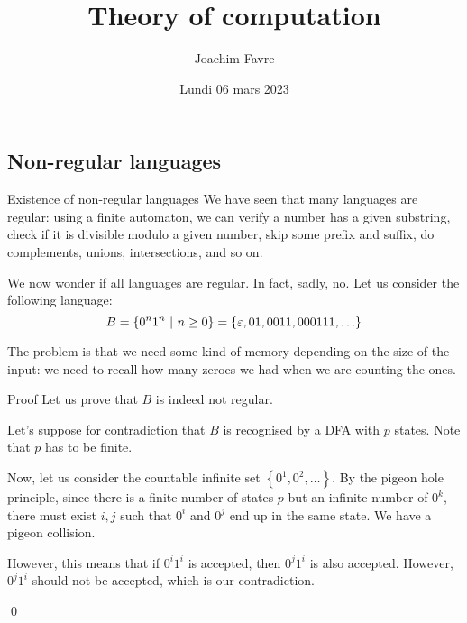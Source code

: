 \documentclass[a4paper]{article}
\title{Theory of computation}
\author{Joachim Favre}
\date{Lundi 06 mars 2023}
\begin{document}
\maketitle


\subsection{Non-regular languages}

\begin{parag}{Existence of non-regular languages}
    We have seen that many languages are regular: using a finite automaton, we can verify a number has a given substring, check if it is divisible modulo a given number, skip some prefix and suffix, do complements, unions, intersections, and so on.
    
    We now wonder if all languages are regular. In fact, sadly, no. Let us consider the following language: 
    \[B = \left\{0^n 1^n \suchthat n \geq 0\right\} = \left\{\epsilon, 01, 0011, 000111, \ldots\right\}\]
    
    The problem is that we need some kind of memory depending on the size of the input: we need to recall how many zeroes we had when we are counting the ones. 

    \begin{subparag}{Proof}
        Let us prove that $B$ is indeed not regular.

        Let's suppose for contradiction that $B$ is recognised by a DFA with $p$ states. Note that $p$ has to be finite.

        Now, let us consider the countable infinite set $\left\{0^1, 0^2, \ldots\right\}$. By the pigeon hole principle, since there is a finite number of states $p$ but an infinite number of $0^k$, there must exist $i, j$ such that $0^i$ and $0^j$ end up in the same state. We have a pigeon collision.

        However, this means that if $0^i 1^i$ is accepted, then $0^j 1^i$ is also accepted. However, $0^j 1^i$ should not be accepted, which is our contradiction.

        \qed
    \end{subparag}
\end{parag}
\end{document}
